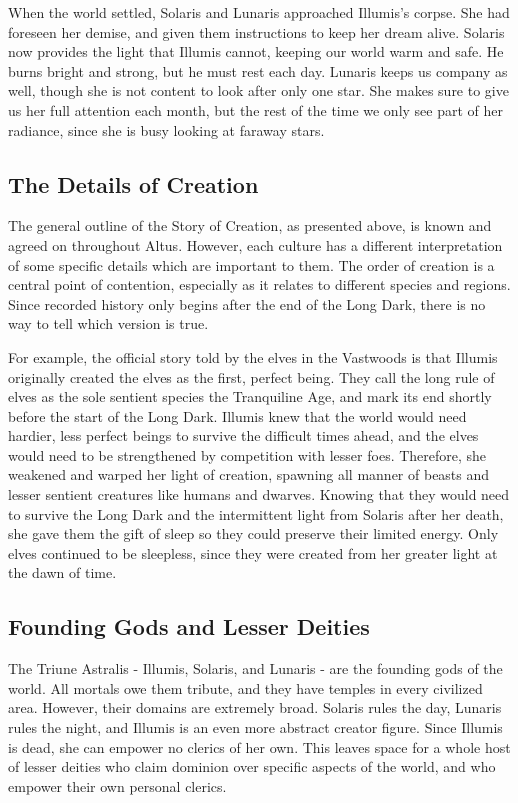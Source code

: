     When the world settled, Solaris and Lunaris approached Illumis's corpse.
    She had foreseen her demise, and given them instructions to keep her dream alive.
    Solaris now provides the light that Illumis cannot, keeping our world warm and safe.
    He burns bright and strong, but he must rest each day.
    Lunaris keeps us company as well, though she is not content to look after only one star.
    She makes sure to give us her full attention each month, but the rest of the time we only see part of her radiance, since she is busy looking at faraway stars.

    \subsection{The Details of Creation} 

        The general outline of the Story of Creation, as presented above, is known and agreed on throughout Altus.
        However, each culture has a different interpretation of some specific details which are important to them.
        The order of creation is a central point of contention, especially as it relates to different species and regions.
        Since recorded history only begins after the end of the Long Dark, there is no way to tell which version is true.

        For example, the official story told by the elves in the Vastwoods is that Illumis originally created the elves as the first, perfect being.
        They call the long rule of elves as the sole sentient species the Tranquiline Age, and mark its end shortly before the start of the Long Dark.
        Illumis knew that the world would need hardier, less perfect beings to survive the difficult times ahead, and the elves would need to be strengthened by competition with lesser foes.
        Therefore, she weakened and warped her light of creation, spawning all manner of beasts and lesser sentient creatures like humans and dwarves.
        Knowing that they would need to survive the Long Dark and the intermittent light from Solaris after her death, she gave them the gift of sleep so they could preserve their limited energy.
        Only elves continued to be sleepless, since they were created from her greater light at the dawn of time.

    \subsection{Founding Gods and Lesser Deities}
        The Triune Astralis - Illumis, Solaris, and Lunaris - are the founding gods of the world.
        All mortals owe them tribute, and they have temples in every civilized area.
        However, their domains are extremely broad.
        Solaris rules the day, Lunaris rules the night, and Illumis is an even more abstract creator figure.
        Since Illumis is dead, she can empower no clerics of her own.
        This leaves space for a whole host of lesser deities who claim dominion over specific aspects of the world, and who empower their own personal clerics.

